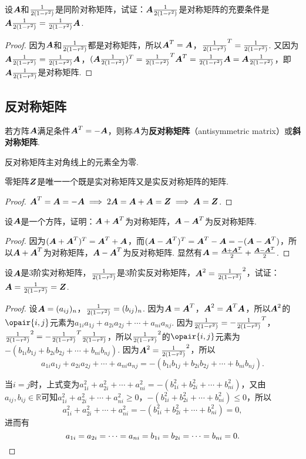\begin{example}
设\(\A\)和\(\B\)是同阶对称矩阵，试证：\(\A\B\)是对称矩阵的充要条件是\(\A\B = \B\A\).
\begin{proof}
因为\(\A\)和\(\B\)都是对称矩阵，所以\(\A^T = \A\)，\(\B^T = \B\).
又因为\(\A\B = \B\A\)，\((\A\B)^T = \B^T \A^T = \B\A = \A\B\)，即\(\A\B\)是对称矩阵.
\end{proof}
\end{example}

\subsection{反对称矩阵}
\begin{definition}
若方阵\(\A\)满足条件\(\A^T = -\A\)，则称\(\A\)为\textbf{反对称矩阵}（antisymmetric matrix）或\textbf{斜对称矩阵}.
\end{definition}

\begin{property}
反对称矩阵主对角线上的元素全为零.
\end{property}

\begin{example}
零矩阵\(\z\)是唯一一个既是实对称矩阵又是实反对称矩阵的矩阵.
\begin{proof}
\(\A^T = \A = -\A \implies 2\A = \A+\A = \z \implies \A = \z\).
\end{proof}
\end{example}

\begin{example}
设\(\A\)是一个方阵，证明：\(\A+\A^T\)为对称矩阵，\(\A-\A^T\)为反对称矩阵.
\begin{proof}
因为\((\A+\A^T)^T = \A^T+\A\)，而\((\A-\A^T)^T = \A^T - \A = -(\A-\A^T)\)，所以\(\A+\A^T\)为对称矩阵，\(\A-\A^T\)为反对称矩阵.
显然有\(\A = \frac{\A + \A^T}{2} + \frac{\A - \A^T}{2}\).
\end{proof}
\end{example}

\begin{example}
设\(\A\)是3阶实对称矩阵，\(\B\)是3阶实反对称矩阵，\(\A^2 = \B^2\)，试证：\(\A = \B = \z\).
\begin{proof}
设\(\A = (a_{ij})_n\)，\(\B = (b_{ij})_n\).
因为\(\A = \A^T\)，\(\A^2 = \A^T \A\)，所以\(\A^2\)的\(\opair{i,j}\)元素为\(a_{1i} a_{1j} + a_{2i} a_{2j} + \dotsb + a_{ni} a_{nj}\).
因为\(\B = -\B^T\)，\(\B^2 = -\B^T \B\)，所以\(\B^2\)的\(\opair{i,j}\)元素为\(-(b_{1i} b_{1j} + b_{2i} b_{2j} + \dotsb + b_{ni} b_{nj})\).
因为\(\A^2 = \B^2\)，所以\[
a_{1i} a_{1j} + a_{2i} a_{2j} + \dotsb + a_{ni} a_{nj}
= -(b_{1i} b_{1j} + b_{2i} b_{2j} + \dotsb + b_{ni} b_{nj}).
\]

当\(i=j\)时，上式变为\(
a_{1i}^2 + a_{2i}^2 + \dotsb + a_{ni}^2
= -(b_{1i}^2 + b_{2i}^2 + \dotsb + b_{ni}^2)
\)，又由\(a_{ij},b_{ij} \in \mathbb{R}\)可知\(a_{1i}^2 + a_{2i}^2 + \dotsb + a_{ni}^2 \geqslant 0\)，\(-(b_{1i}^2 + b_{2i}^2 + \dotsb + b_{ni}^2) \leqslant 0\)，所以\[
a_{1i}^2 + a_{2i}^2 + \dotsb + a_{ni}^2
= -(b_{1i}^2 + b_{2i}^2 + \dotsb + b_{ni}^2) = 0,
\]进而有\[
a_{1i} = a_{2i} = \dotsb = a_{ni} = b_{1i} = b_{2i} = \dotsb = b_{ni} = 0.
\qedhere
\]
\end{proof}
\end{example}
